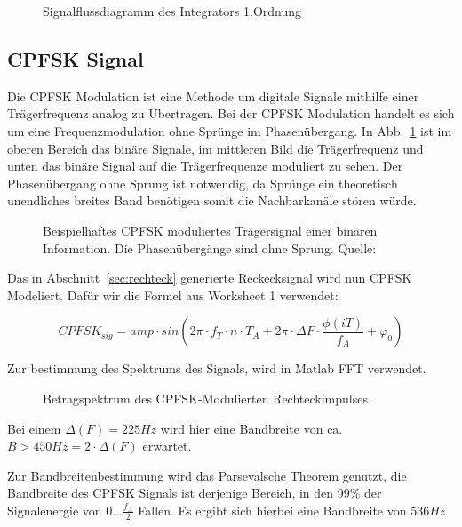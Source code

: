 \documentclass{article}
\begin{document}
\begin{figure}[!h]
    \centering
    \def\svgscale{0.3}
    \caption{Signalflussdiagramm des Integrators 1.Ordnung}
\end{figure}

\subsection{CPFSK Signal}

Die \ac{CPFSK} Modulation ist eine Methode um digitale Signale mithilfe einer Trägerfrequenz analog zu Übertragen.
Bei der \ac{CPFSK} Modulation handelt es sich um eine Frequenzmodulation ohne Sprünge im Phasenübergang. In Abb.~\ref{fsk}
ist im oberen Bereich das binäre Signale, im mittleren Bild die Trägerfrequenz und unten das binäre Signal auf die Trägerfrequenze
moduliert zu sehen. Der Phasenübergang ohne Sprung ist notwendig, da Sprünge ein theoretisch unendliches breites Band benötigen
somit die Nachbarkanäle stören würde.
\begin{figure}[!h]
    \centering
    \def\svgscale{0.3}
    \def\svgwidth{\columnwidth}
    \caption{Beispielhaftes \ac{CPFSK} moduliertes Trägersignal einer binären 
    Information. Die Phasenübergänge sind ohne Sprung. Quelle:~\cite{wiki:fsk}}
    \label{fsk}
\end{figure}

Das in Abschnitt~\ref{sec:rechteck} generierte Reckecksignal wird nun CPFSK Modeliert.
Dafür wir die Formel aus Worksheet 1 verwendet:

$$CPFSK_{sig} = amp \cdot  sin(2  \pi \cdot f_T \cdot n \cdot T_A + 2 \pi \cdot \varDelta{F} \cdot \frac{\phi (iT)}{f_A} + \varphi_0) $$

Zur bestimmung des Spektrums des Signals, wird in Matlab FFT verwendet.
\begin{figure}[!h]
    \centering
    \def\svgscale{0.3}
    \def\svgwidth{\columnwidth}
    \caption{Betragspektrum des CPFSK-Modulierten Rechteckimpulses.}
\end{figure}
Bei einem $\varDelta(F) = 225Hz$ wird hier eine Bandbreite von ca. $B > 450Hz = 2\cdot \varDelta(F) $ erwartet.

Zur Bandbreitenbestimmung wird das Parsevalsche Theorem genutzt, die Bandbreite des CPFSK Signals ist derjenige Bereich,
in den 99\% der Signalenergie von $0...\frac{f_A}{2}$ Fallen. Es ergibt sich hierbei eine Bandbreite von $536Hz$
\end{document}
